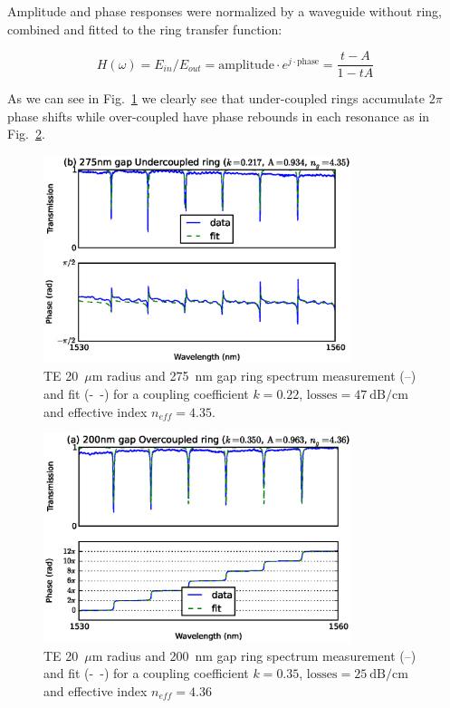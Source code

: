 \documentclass[journal]{IEEEtran}
\begin{document}
Amplitude and phase responses were normalized by a waveguide without ring, combined and fitted to the ring transfer function:

\begin{equation}
	H(\omega)=E_{in}/E_{out}=\mathrm{amplitude}\cdot e^{j\cdot \mathrm{phase}} = \frac{t-A}{1-tA}
\end{equation}
 

As we can see in Fig.~\ref{fig:undercoupled} we clearly see that under-coupled rings accumulate $2\pi$ phase shifts while over-coupled have phase rebounds in each resonance as in Fig.~\ref{fig:overcoupled}. 

     
\begin{figure}[htb]
  \centerline{\includegraphics[width=9cm]{r20g275TE_fitPhaseAmp}}
  \caption{TE 20~$\mu$m radius and 275~nm gap ring spectrum measurement (--) and fit (-~-) for a coupling coefficient $k=0.22$, $\mathrm{losses=47~dB/cm}$ and effective index $n_{eff}=4.35$.}
  \label{fig:undercoupled} %
\end{figure}




\begin{figure}[htb]
  \centerline{\includegraphics[width=9cm]{r20g200TE_fitPhaseAmp}}
  \caption{TE 20~$\mu$m radius and 200~nm gap ring spectrum measurement (--) and fit (-~-) for a coupling coefficient $k=0.35$, $\mathrm{losses=25~dB/cm}$ and effective index $n_{eff}=4.36$}
  \label{fig:overcoupled} %
\end{figure}
\end{document}
